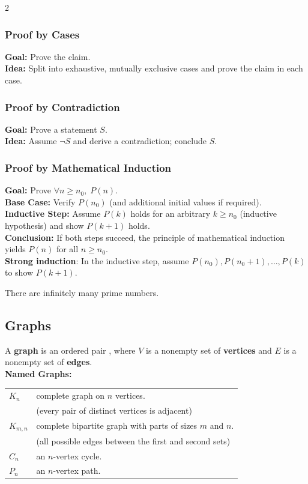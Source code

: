 \documentclass[5pt]{article}
\begin{document}
\begin{multicols}{2}
\subsubsection{Proof by Cases}
\textbf{Goal:} Prove the claim.\\
\textbf{Idea:} Split into exhaustive, mutually exclusive cases and prove the claim in each case.\\

\subsubsection{Proof by Contradiction}
\textbf{Goal:} Prove a statement $S$.\\
\textbf{Idea:} Assume $\lnot S$ and derive a contradiction; conclude $S$.\\

\subsubsection{Proof by Mathematical Induction}
\textbf{Goal:} Prove $\forall n\ge n_0,\;P(n)$.\\
\textbf{Base Case:} Verify $P(n_0)$ (and additional initial values if required).\\
\textbf{Inductive Step:} Assume $P(k)$ holds for an arbitrary $k\ge n_0$ (inductive hypothesis) and show $P(k+1)$ holds.\\
\textbf{Conclusion:} If both steps succeed, the principle of mathematical induction yields $P(n)$ for all $n\ge n_0$.\\
\textbf{Strong induction}: In the inductive step, assume $P(n_0),P(n_0+1),\dots,P(k)$ to show $P(k+1)$.\\

\begin{theorem}
    There are infinitely many prime numbers.
\end{theorem}

\subsection{Graphs}
A \textbf{graph} is an ordered pair , where $V$ is a nonempty set of \textbf{vertices} and $E$ is a
nonempty set of \textbf{edges}.\\
\textbf{Named Graphs:}\\
\begin{tabular}{ll}
    $K_n$       & complete graph on $n$ vertices.\\
                & (every pair of distinct vertices is adjacent)\\
    $K_{m,n}$   & complete bipartite graph with parts of sizes $m$ and $n$.\\
                & (all possible edges between the first and second sets)\\
    $C_n$       & an $n$-vertex cycle.\\
    $P_n$       & an $n$-vertex path.\\
\end{tabular}


\end{multicols}
\end{document}
